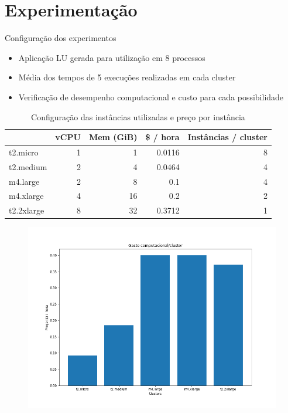 \documentclass{beamer}
\begin{document}
\section{Experimentação}

\begin{frame}{Configuração dos experimentos}
	\begin{itemize}
		\item Aplicação LU gerada para utilização em 8 processos
		\item Média dos tempos de 5 execuções realizadas em cada cluster
		\item Verificação de desempenho computacional e custo para cada possibilidade 
	\end{itemize}
\end{frame}


\begin{frame}
\begin{table}[htbp]
\center
\small
\caption{Configuração das instâncias utilizadas e preço por instância}
\begin{tabular}{|l|r|r|r|r|}
\hline
 & \multicolumn{1}{c|}{\textbf{vCPU}} & \multicolumn{1}{c|}{\textbf{Mem (GiB)}} & \multicolumn{1}{c|}{\textbf{\$ / hora}} & \multicolumn{1}{l|}{\textbf{Instâncias / cluster}} \\ \hline
t2.micro & 1 & 1 & 0.0116 & 8 \\ \hline
t2.medium & 2 & 4 & 0.0464 & 4 \\ \hline
m4.large & 2 & 8 & 0.1 & 4 \\ \hline
m4.xlarge & 4 & 16 & 0.2 & 2 \\ \hline
t2.2xlarge & 8 & 32 & 0.3712 & 1 \\ \hline
\end{tabular}
\label{tab:inst}
\end{table}
\end{frame}

\begin{frame}
	\begin{figure}[ht]
		\begin{center}
 	 	  \includegraphics[scale=0.4]{figuras/AllNodesPrecoHora.png}	
		  \label{fig:fluxogramaAG}		
		\end{center}
	\end{figure}
\end{frame}
\end{document}
